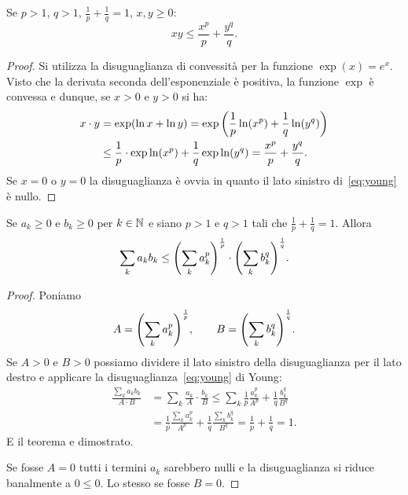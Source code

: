 \begin{theorem}%
\label{th:young}%
%
%
Se $p>1$, $q>1$, $\frac{1}{p}+\frac{1}{q}=1$, $x,y\ge 0$:
\begin{equation}\label{eq:young}
  x y \le \frac{x^p}{p} + \frac{y^q}{q}.
\end{equation}
\end{theorem}
%
\begin{proof}
Si utilizza la disuguaglianza di convessità per la funzione $\exp(x)=e^x$. 
Visto che la derivata seconda dell'esponenziale è positiva, la funzione $\exp$ 
è convessa e dunque, se $x>0$ e $y>0$ si ha:
\begin{align*}
 x\cdot y 
  &= \exp(\ln x + \ln y)
  = \exp{\left( \frac 1 p \ln (x^p) + \frac 1 q \ln (y^q) \right)}  \\
  &\le \frac 1 p \cdot \exp \ln (x^p) + \frac 1 q \exp \ln (y^q)
  = \frac{x^p}{p} + \frac{y^q}{q}.
\end{align*}
Se $x=0$ o $y=0$ la disuguaglianza è ovvia in quanto il lato sinistro 
di~\eqref{eq:young} è nullo.
\end{proof}

\begin{theorem}
Se $a_k\ge 0$ e $b_k\ge 0$ per $k\in {\mathbb N}$
e siano $p>1$ e $q>1$ tali che $\frac 1 p + \frac 1 q = 1$.
Allora 
\[
 \sum_k a_k b_k  \le {\left( \sum_k a_k^p \right)}^{1 \over p} \cdot {\left( \sum_k b_k^q \right)}^{1\over q}.
\]
\end{theorem}
\begin{proof}
Poniamo 
\[
A = {\left( \sum_k a_k^p \right)}^{1 \over p}, \qquad 
B = {\left( \sum_k b_k^q \right)}^{1\over q}.
\]
Se $A>0$ e $B>0$ possiamo dividere il lato sinistro della disuguaglianza 
per il lato destro e applicare la disuguaglianza~\eqref{eq:young} di Young:
\begin{align*}
  \frac{\sum_k a_k b_k}{A\cdot B} 
  & = \sum_k \frac{a_k}{A}\cdot \frac{b_k}{B} 
  \le \sum_k \frac 1 p \frac{a_k^p}{A^p} + \frac 1 q \frac{b_k^q}{B^q} \\
  &= \frac 1 p \frac{\sum_k a_k^p}{A^p} + \frac 1 q \frac{\sum_k b_k^q}{B^q}
  = \frac 1 p + \frac 1 q = 1.
\end{align*}
E il teorema e dimostrato. 

Se fosse $A=0$ tutti i termini $a_k$ sarebbero nulli e la disuguaglianza 
si riduce banalmente a $0\le 0$. Lo stesso se fosse $B=0$.  
\end{proof}

